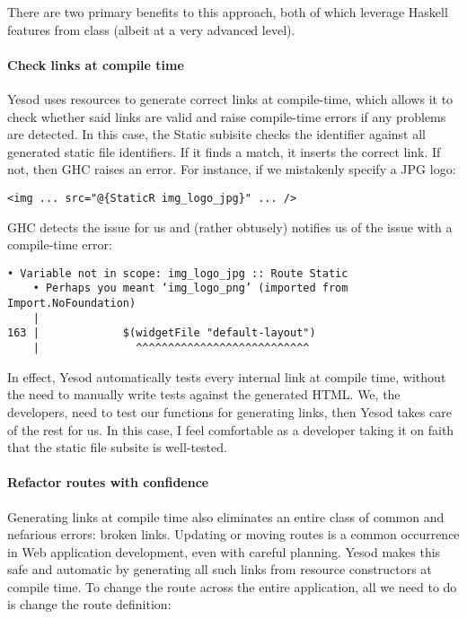 There are two primary benefits to this approach, both of which leverage Haskell features from class (albeit at a very advanced level).

\paragraph{Check links at compile time} Yesod uses resources to generate correct links at compile-time, which allows it to check whether said links are valid and raise compile-time errors if any problems are detected. In this case, the Static subisite checks the identifier  against all generated static file identifiers. If it finds a match, it inserts the correct link. If not, then GHC raises an error. For instance, if we mistakenly specify a JPG logo:

\begin{Verbatim}[samepage=true]
<img ... src="@{StaticR img_logo_jpg}" ... />
\end{Verbatim}

GHC detects the issue for us and (rather obtusely) notifies us of the issue with a compile-time error:

\begin{Verbatim}[samepage=true]
    • Variable not in scope: img_logo_jpg :: Route Static
    • Perhaps you meant ‘img_logo_png’ (imported from Import.NoFoundation)
    |
163 |             $(widgetFile "default-layout")
    |               ^^^^^^^^^^^^^^^^^^^^^^^^^^^
\end{Verbatim}

In effect, Yesod automatically tests every internal link at compile time, without the need to manually write tests against the generated HTML. We, the developers, need to test our functions for generating links, then Yesod takes care of the rest for us. In this case, I feel comfortable as a developer taking it on faith that the static file subsite is well-tested.

\paragraph{Refactor routes with confidence} Generating links at compile time also eliminates an entire class of common and nefarious errors: broken links. Updating or moving routes is a common occurrence in Web application development, even with careful planning. Yesod makes this safe and automatic by generating all such links from resource constructors at compile time. To change the route across the entire application, all we need to do is change the route definition:


